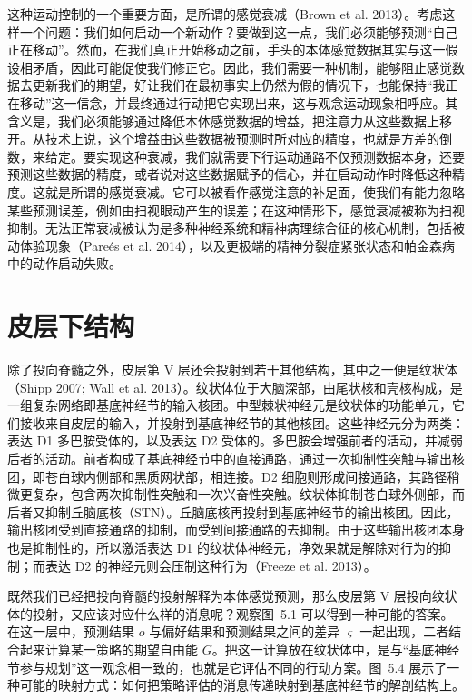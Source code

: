 这种运动控制的一个重要方面，是所谓的感觉衰减（Brown et al. 2013）。考虑这样一个问题：我们如何启动一个新动作？要做到这一点，我们必须能够预测“自己正在移动”。然而，在我们真正开始移动之前，手头的本体感觉数据其实与这一假设相矛盾，因此可能促使我们修正它。因此，我们需要一种机制，能够阻止感觉数据去更新我们的期望，好让我们在最初事实上仍然为假的情况下，也能保持“我正在移动”这一信念，并最终通过行动把它实现出来，这与观念运动现象相呼应。其含义是，我们必须能够通过降低本体感觉数据的增益，把注意力从这些数据上移开。从技术上说，这个增益由这些数据被预测时所对应的精度，也就是方差的倒数，来给定。要实现这种衰减，我们就需要下行运动通路不仅预测数据本身，还要预测这些数据的精度，或者说对这些数据赋予的信心，并在启动动作时降低这种精度。这就是所谓的感觉衰减。它可以被看作感觉注意的补足面，使我们有能力忽略某些预测误差，例如由扫视眼动产生的误差；在这种情形下，感觉衰减被称为扫视抑制。无法正常衰减被认为是多种神经系统和精神病理综合征的核心机制，包括被动体验现象（Pareés et al. 2014），以及更极端的精神分裂症紧张状态和帕金森病中的动作启动失败。

\section{皮层下结构}

除了投向脊髓之外，皮层第 V 层还会投射到若干其他结构，其中之一便是纹状体（Shipp 2007; Wall et al. 2013）。纹状体位于大脑深部，由尾状核和壳核构成，是一组复杂网络即基底神经节的输入核团。中型棘状神经元是纹状体的功能单元，它们接收来自皮层的输入，并投射到基底神经节的其他核团。这些神经元分为两类：表达 D1 多巴胺受体的，以及表达 D2 受体的。多巴胺会增强前者的活动，并减弱后者的活动。前者构成了基底神经节中的直接通路，通过一次抑制性突触与输出核团，即苍白球内侧部和黑质网状部，相连接。D2 细胞则形成间接通路，其路径稍微更复杂，包含两次抑制性突触和一次兴奋性突触。纹状体抑制苍白球外侧部，而后者又抑制丘脑底核（STN）。丘脑底核再投射到基底神经节的输出核团。因此，输出核团受到直接通路的抑制，而受到间接通路的去抑制。由于这些输出核团本身也是抑制性的，所以激活表达 D1 的纹状体神经元，净效果就是解除对行为的抑制；而表达 D2 的神经元则会压制这种行为（Freeze et al. 2013）。

既然我们已经把投向脊髓的投射解释为本体感觉预测，那么皮层第 V 层投向纹状体的投射，又应该对应什么样的消息呢？观察图~5.1 可以得到一种可能的答案。在这一层中，预测结果 $o$ 与偏好结果和预测结果之间的差异 $\varsigma$ 一起出现，二者结合起来计算某一策略的期望自由能 $G$。把这一计算放在纹状体中，是与“基底神经节参与规划”这一观念相一致的，也就是它评估不同的行动方案。图~5.4 展示了一种可能的映射方式：如何把策略评估的消息传递映射到基底神经节的解剖结构上。

